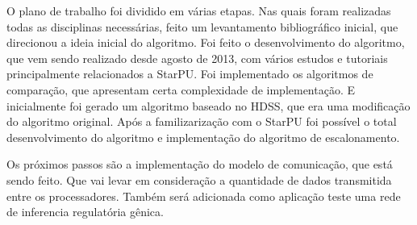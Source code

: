 O plano de trabalho foi dividido em várias etapas. Nas quais foram realizadas todas as disciplinas necessárias, feito um levantamento bibliográfico inicial, que direcionou a ideia inicial do algoritmo. Foi feito o desenvolvimento do algoritmo, que vem sendo realizado desde agosto de 2013, com vários estudos e tutoriais principalmente relacionados a StarPU. Foi implementado os algoritmos de comparação, que apresentam certa complexidade de implementação. E inicialmente foi gerado um algoritmo baseado no HDSS, que era uma modificação do algoritmo original. Após a familizarização com o StarPU foi possível o total desenvolvimento do algoritmo e implementação do algoritmo de escalonamento. 

Os próximos passos são a implementação do modelo de comunicação, que está sendo feito. Que vai levar em consideração a quantidade de dados transmitida entre os processadores. Também será adicionada como aplicação teste uma rede de inferencia regulatória gênica.



